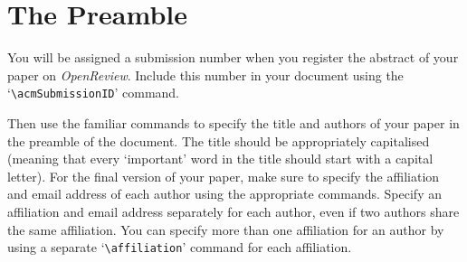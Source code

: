 \documentclass[sigconf,anonymous]{aamas}
\begin{document}




\section{The Preamble}

You will be assigned a submission number when you register the abstract 
of your paper on \textit{OpenReview}. Include this number in your 
document using the `\verb|\acmSubmissionID|' command.

Then use the familiar commands to specify the title and authors of your
paper in the preamble of the document. The title should be appropriately 
capitalised (meaning that every `important' word in the title should 
start with a capital letter). For the final version of your paper, make 
sure to specify the affiliation and email address of each author using 
the appropriate commands. Specify an affiliation and email address 
separately for each author, even if two authors share the same 
affiliation. You can specify more than one affiliation for an author by 
using a separate `\verb|\affiliation|' command for each affiliation.
\end{document}
